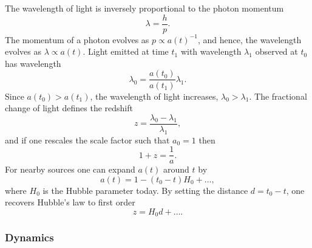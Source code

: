 The wavelength of light is inversely proportional to the photon momentum
%
\begin{equation}
	\lambda
	= \frac{h}{p}.
\end{equation}
%
The momentum of a photon evolves as \(p \propto {a(t)}^{-1}\), and hence, the wavelength evolves as \(\lambda \propto a(t)\).
Light emitted at time \(t_{1}\) with wavelength \(\lambda_{1}\) observed at \(t_{0}\) has wavelength
%
\begin{equation}
	\lambda_{0}
	= \frac{a(t_{0})}{a(t_{1})} \lambda_{1}.
\end{equation}
%
Since \(a(t_{0}) > a(t_{1})\), the wavelength of light increases, \ie{} \(\lambda_{0} > \lambda_{1}\).
The fractional change of light defines the redshift
%
\begin{equation}
	z
	= \frac{\lambda_{0} - \lambda_{1}}{\lambda_{1}},
\end{equation}
%
and if one rescales the scale factor such that \(a_{0}=1\) then
%
\begin{equation}
	1 + z
	= \frac{1}{a}.
\end{equation}
%
For nearby sources one can expand \(a(t)\) around \(t\) by
%
\begin{equation}
	a(t)
	= 1 - (t_{0} - t)H_{0} + \ldots,
\end{equation}
%
where \(H_{0}\) is the Hubble parameter today.
By setting the distance \(d = t_{0} - t\), one recovers Hubble's law to first order
%
\begin{equation}
	z
	= H_{0}d + \ldots.
\end{equation}

\subsubsection{Dynamics}

